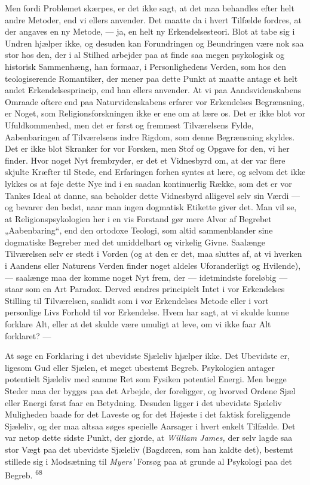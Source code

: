 \documentclass[12pt,a4paper,openany]{book}
\newcommand{\opage}[1]{\marginnote{\footnotesize\textit{[#1]}}}
\begin{document}
Men fordi Problemet skærpes, er det ikke sagt, at det maa behandles
efter helt andre Metoder, end vi ellers anvender. Det maatte da i hvert
Tilfælde fordres, at der angaves en ny Metode, --- ja, en helt ny
Erkendelsesteori. Blot at tabe sig i Undren hjælper ikke, og desuden kan
Forundringen og Beundringen være nok saa stor hos den, der i al Stilhed
arbejder paa at finde saa megen psykologisk og historisk Sammenhæng, han
formaar, i Personlighedens Verden, som hos den teologiserende
Romantiker, der mener paa dette Punkt at maatte antage et helt andet
Erkendelsesprincip, end han ellers anvender. At vi paa Aandsvidenskabens
Omraade oftere end paa Naturvidenskabens erfarer vor Erkendelses
Begrænsning, er Noget, som Religionsforskningen ikke er ene om at lære
os. Det er ikke blot vor Ufuldkommenhed, men det er først og fremmest
Tilværelsens Fylde, Aabenbaringen af Tilværelsens indre Rigdom, som
denne Begrænsning skyldes. Det er ikke blot Skranker for vor Forsken,
men Stof og Opgave for den, vi her finder. Hvor noget Nyt frembryder, er
det et Vidnesbyrd om, at der var flere skjulte Kræfter til Stede, end
Erfaringen forhen syntes at lære, og selvom det ikke lykkes os at føje
dette Nye ind i en saadan kontinuerlig Række, som det er vor Tankes
\opage{132}Ideal at danne, saa beholder dette Vidnesbyrd alligevel selv
sin Værdi --- og bevarer den bedst, naar man ingen dogmatisk Etikette
giver det. Man vil se, at Religionspsykologien her i en vis Forstand gør
mere Alvor af Begrebet „Aabenbaring“, end den ortodoxe Teologi, som
altid sammenblander sine dogmatiske Begreber med det umiddelbart og
virkelig Givne. Saalænge Tilværelsen selv er stedt i Vorden (og at den
er det, maa sluttes af, at vi hverken i Aandens eller Naturens Verden
finder noget aldeles Uforanderligt og Hvilende), --- saalænge maa der
komme noget Nyt frem, der --- idetmindste foreløbig --- staar som en Art
Paradox. Derved ændres principielt Intet i vor Erkendelses Stilling til
Tilværelsen, saalidt som i vor Erkendelses Metode eller i vort
personlige Livs Forhold til vor Erkendelse. Hvem har sagt, at vi skulde
kunne forklare Alt, eller at det skulde være umuligt at leve, om vi ikke
faar Alt forklaret? ---

At søge en Forklaring i det ubevidste Sjæleliv hjælper ikke. Det
Ubevidste er, ligesom Gud eller Sjælen, et meget ubestemt Begreb.
Psykologien antager potentielt Sjæleliv med samme Ret som Fysiken
potentiel Energi. Men begge Steder maa der bygges paa det Arbejde, der
foreligger, og hvorved Ordene Sjæl eller Energi først faar en Betydning.
Desuden ligger i det ubevidste Sjæleliv Muligheden baade for det Laveste
og for det Højeste i det faktisk foreliggende Sjæleliv, og der maa
altsaa søges specielle Aarsager i hvert enkelt Tilfælde. Det var netop
dette sidste Punkt, der gjorde, at \textit{William James,} der selv
lagde saa stor Vægt paa det ubevidste Sjæleliv (Bagdøren, som han kaldte
det), bestemt stillede sig i Modsætning til \textit{Myers’} Forsøg paa
at grunde al Psykologi paa det Begreb. \textsuperscript{68}
\end{document}
